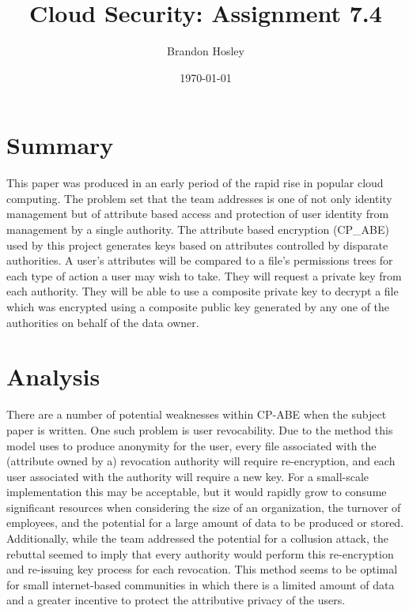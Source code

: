 \documentclass[]{article}
\title{Cloud Security: Assignment 7.4}
\author{Brandon Hosley}
\date{\today}
\begin{document}
	\maketitle
	
\section{Summary} 

This paper\cite{Teaho2012} was produced in an early period of the rapid rise in popular cloud computing.
The problem set that the team addresses is one of not only identity management but of attribute based access and protection of user identity from management by a single authority.
The attribute based encryption (CP\_ABE) used by this project generates keys based on attributes controlled by disparate authorities.
A user's attributes will be compared to a file's permissions trees for each type of action a user may wish to take.
They will request a private key from each authority. 
They will be able to use a composite private key to decrypt a file which was encrypted using a composite public key generated by any one of the authorities on behalf of the data owner.


\section{Analysis}

There are a number of potential weaknesses within CP-ABE when the subject paper is written. 
One such problem is user revocability.
Due to the method this model uses to produce anonymity for the user, every file associated with the (attribute owned by a) revocation authority will require re-encryption, and each user associated with the authority will require a new key.
For a small-scale implementation this may be acceptable, but it would rapidly grow to consume significant resources when considering the size of an organization, the turnover of employees, and the potential for a large amount of data to be produced or stored.
Additionally, while the team addressed the potential for a collusion attack, the rebuttal seemed to imply that every authority would perform this re-encryption and re-issuing key process for each revocation.
This method seems to be optimal for small internet-based communities in which there is a limited amount of data and a greater incentive to protect the attributive privacy of the users.



\clearpage


\end{document}
